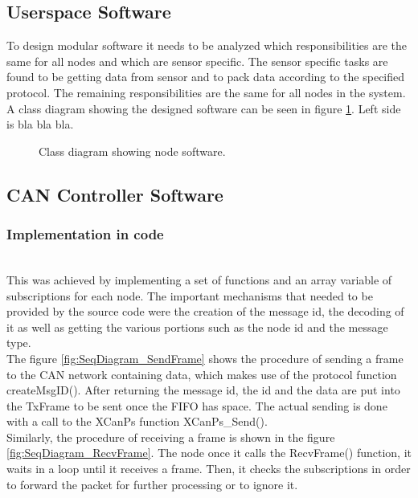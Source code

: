 \subsection{Userspace Software}
To design modular software it needs to be analyzed which responsibilities are the same for all nodes and which are sensor specific.
The sensor specific tasks are found to be getting data from sensor and to pack data according to the specified protocol.
The remaining responsibilities are the same for all nodes in the system. 
A class diagram showing the designed software can be seen in figure \ref{fig:node_class_diagram}.
Left side is bla bla bla.

\begin{figure}[!h]
\centering
{}
\caption{Class diagram showing node software.}
\label{fig:node_class_diagram}
\end{figure}


\subsection{CAN Controller Software}
\subsubsection{Implementation in code}~\\
This was achieved by implementing a set of functions and an array variable of subscriptions for each node.
The important mechanisms that needed to be provided by the source code were the creation of the message id, the decoding of it as well as getting the various portions such as the node id and the message type.
\\
The figure \ref{fig:SeqDiagram_SendFrame} shows the procedure of sending a frame to the CAN network containing data, which makes use of the protocol function createMsgID().
After returning the message id, the id and the data are put into the TxFrame to be sent once the FIFO has space.
The actual sending is done with a call to the XCanPs function XCanPs\_Send().
\\
Similarly, the procedure of receiving a frame is shown in the figure \ref{fig:SeqDiagram_RecvFrame}.
The node once it calls the RecvFrame() function, it waits in a loop until it receives a frame. Then, it checks the subscriptions in order to forward the packet for further processing or to ignore it.

